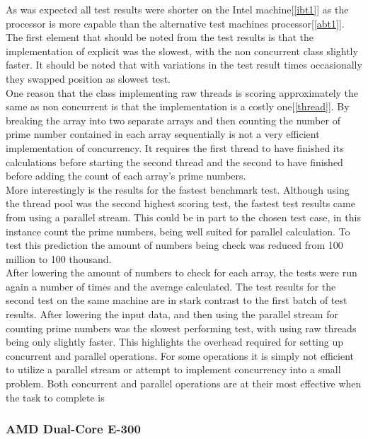\documentclass[10pt]{article}  %
\theoremstyle{definition}
\theoremstyle{remark}
\begin{document}
As was expected all test results were shorter on the Intel machine[\ref{ibt1}] as the processor is more capable than the alternative test machines processor[\ref{abt1}]. \\

The first element that should be noted from the test results is that the implementation of explicit was the slowest, with the non concurrent class slightly faster. It should be noted that with variations in the test result times occasionally they swapped position as slowest test. \\

One reason that the class implementing raw threads is scoring approximately the same as non concurrent is that the implementation is a costly one[\ref{thread}]. By breaking the array into two separate arrays and then counting the number of prime number contained in each array sequentially is not a very efficient implementation of concurrency. It requires the first thread to have finished its calculations before starting the second thread and the second to have finished before adding the count of each array's prime numbers.\\

More interestingly is the results for the fastest benchmark test. Although using the thread pool was the second highest scoring test, the fastest test results came from using a parallel stream. This could be in part to the chosen test case, in this instance count the prime numbers, being well suited for parallel calculation. To test this prediction the amount of numbers being check was reduced from 100 million to 100 thousand.\\

After lowering the amount of numbers to check for each array, the tests were run again a number of times and the average calculated. The test results for the second test on the same machine are in stark contrast to the first batch of test results. After lowering the input data, and then using the parallel stream for counting prime numbers was the slowest performing test, with using raw threads being only slightly faster. This highlights the overhead required for setting up concurrent and parallel operations. For some operations it is simply not efficient to utilize a parallel stream or attempt to implement concurrency into a small problem. Both concurrent and parallel operations are at their most effective when the task to complete is \\


\subsubsection{AMD Dual-Core E-300}
\end{document}
